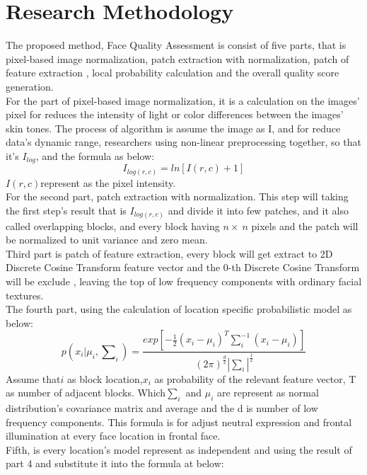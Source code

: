 \documentclass[12pt]{article}
\begin{document}
\section{Research Methodology}
The proposed method, Face Quality Assessment is consist of five parts, that is pixel-based image normalization, patch extraction with normalization, patch of feature extraction , local probability calculation and the overall quality score generation.\vspace{3mm}\\
For the part of pixel-based image normalization, it is a calculation on the images’ pixel for reduces the intensity of light or color differences between the images’ skin tones. The process of algorithm is assume the image as I, and for reduce data’s dynamic range, researchers using non-linear preprocessing together, so that it’s $I_{log}$,  and the formula as below:
\[I_{log(r,c)}=ln[I(r,c)+1]\]
$I(r,c)$represent as the pixel intensity.\vspace{3mm}\\
For the second part, patch extraction with normalization. This step will taking the first step’s result that is $I_{log(r,c)}$ and divide it into few patches, and it also called overlapping blocks, and every block having $n \times\ n$ pixels and the patch will be normalized to unit variance and zero mean.\vspace{3mm}\\
Third part is patch of feature extraction, every block will get extract to 2D Discrete Cosine Transform feature vector and the 0-th Discrete Cosine Transform  will be exclude , leaving the top of low frequency components with  ordinary facial textures.\vspace{3mm}\\
The fourth part, using the calculation of location specific probabilistic model as below:
\[p(x_{i}| \mu_{i},\sum \nolimits_{i})= \frac{exp[-\frac{1}{2}(x_{i}-\mu_{i})^T\sum\nolimits_{i}^{-1}(x_{i}-\mu_{i})]}{(2\pi)^{\frac{d}{2}}|\sum\nolimits_{i}|^{\frac{1}{2}}}\]
Assume that$ i$ as block location,$ x_{i}$ as probability of the relevant feature vector, T as number of adjacent blocks. Which$\sum\nolimits_{i}$ and $\mu_{i}$ are represent as normal distribution’s covariance matrix and average and the d is number of low frequency components. This formula is for adjust neutral expression and frontal illumination at every face location in frontal face.\vspace{3mm}\\
Fifth, is every location’s model represent as independent and using the result of part 4 and substitute it into the formula at below:
\end{document}
